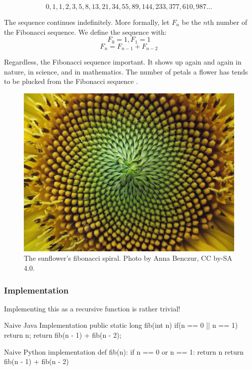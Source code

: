 $$0, 1, 1, 2, 3, 5, 8, 13, 21, 34, 55, 89, 144, 233, 377, 610, 987...$$

The sequence continues indefinitely. More formally, let $F_n$ be the $n$th number of the Fibonacci sequence. We define the sequence with:
$$ F_{0} = 1, F_{1} = 1$$
$$ F_n = F_{n-1} + F_{n-2}$$



Regardless, the Fibonacci sequence important.  It shows up again and again in nature, in science, and in mathematics.  The number of petals a flower has tends to be plucked from the Fibonacci sequence \cite{turner2020flowers}.


\begin{figure}
	\centering
	\includegraphics[width=0.7\linewidth]{pics/sunflower}
	\caption{The sunflower's fibonacci spiral. Photo by Anna Benczur, CC by-SA 4.0.}
	\label{fig:sunflower}
\end{figure}




\subsubsection{Implementation}
Implementing this as a recursive function is rather trivial!

\begin{javacode}{Naive Java Implementation}
public static long fib(int n){
	if(n == 0 || n == 1) {
		return n;
	}
	return fib(n - 1) + fib(n - 2);
}
\end{javacode}

\begin{pycode}{Naive Python implementation}
def fib(n):
	if n == 0 or n == 1:
		return n
	return fib(n - 1) + fib(n - 2)
\end{pycode}

